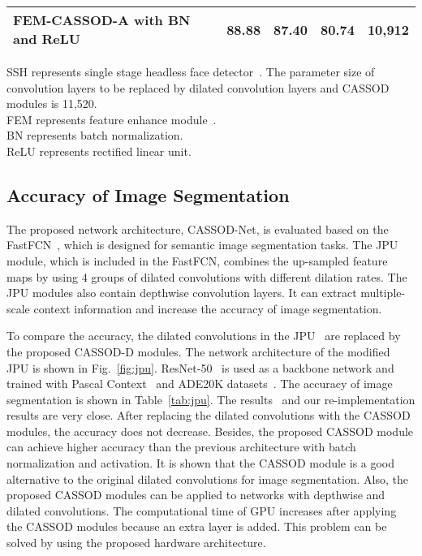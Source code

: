 \documentclass[10pt,twocolumn,letterpaper]{article}
\begin{document}
\begin{table*}
\begin{center}
\begin{tabular}{l|ccc|c}
  FEM-CASSOD-A with BN and ReLU       & 88.88                        & 87.40                           & 80.74                                &  \textbf{10,912}      \\                
\hline
\end{tabular}
\end{center}
{\footnotesize
SSH represents single stage headless face detector~\cite{Najibi17}. The parameter size of convolution layers to be replaced by dilated convolution layers and CASSOD modules is 11,520.\\
FEM represents feature enhance module~\cite{Li18_1}.\\
BN represents batch normalization.\\
ReLU represents rectified linear unit.\\
}
\label{tab:dsfd}
\end{table*}



\subsection{Accuracy of Image Segmentation}
\label{subsec:segmentation}

The proposed network architecture, CASSOD-Net, is evaluated based on the FastFCN~\cite{Wu19}, which is designed for semantic image segmentation tasks. The JPU module, which is included in the FastFCN, combines the up-sampled feature maps by using 4 groups of dilated convolutions with different dilation rates. The JPU modules also contain depthwise convolution layers. It can extract multiple-scale context information and increase the accuracy of image segmentation.

To compare the accuracy, the dilated convolutions in the JPU~\cite{Wu19} are replaced by the proposed CASSOD-D modules. The network architecture of the modified JPU is shown in Fig.~\ref{fig:jpu}. ResNet-50~\cite{He15} is used as a backbone network and trained with Pascal Context~\cite{Mottaghi14} and ADE20K datasets~\cite{Zhou17}. The accuracy of image segmentation is shown in Table~\ref{tab:jpu}. The results~\cite{Wu19} and our re-implementation results are very close. After replacing the dilated convolutions with the CASSOD modules, the accuracy does not decrease. Besides, the proposed CASSOD module can achieve higher accuracy than the previous architecture with batch normalization and activation. It is shown that the CASSOD module is a good alternative to the original dilated convolutions for image segmentation. Also, the proposed CASSOD modules can be applied to networks with depthwise and dilated convolutions. The computational time of GPU increases after applying the CASSOD modules because an extra layer is added. This problem can be solved by using the proposed hardware architecture.
\end{document}
